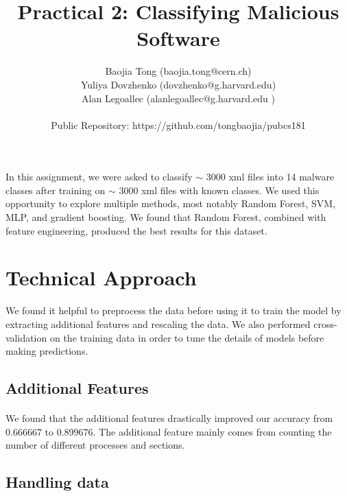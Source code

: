 \documentclass[11pt]{article}
\title{Practical 2: Classifying Malicious Software}
\author{ Baojia Tong (baojia.tong@cern.ch)\\Yuliya Dovzhenko (dovzhenko@g.harvard.edu)\\Alan Legoallec (alanlegoallec@g.harvard.edu )\\\\Public Repository: https://github.com/tongbaojia/pubcs181}
\begin{document}
\maketitle{}


\noindent In this assignment, we were asked to classify $\sim$ 3000 xml files into 14 malware classes after training on $\sim$ 3000 xml files with known classes. We used this opportunity to explore multiple methods, most notably Random Forest, SVM, MLP, and gradient boosting. We found that Random Forest, combined with feature engineering, produced the best results for this dataset. 

\section{Technical Approach}
We found it helpful to preprocess the data before using it to train the model by extracting additional features and rescaling the data. We also performed cross-validation on the training data in order to tune the details of models before making predictions.

\subsection{Additional Features}
\paragraph{}
We found that the additional features drastically improved our accuracy from 0.666667 to 0.899676. The additional feature mainly comes from counting the number of different processes and sections.


\subsection{Handling data}
\end{document}

